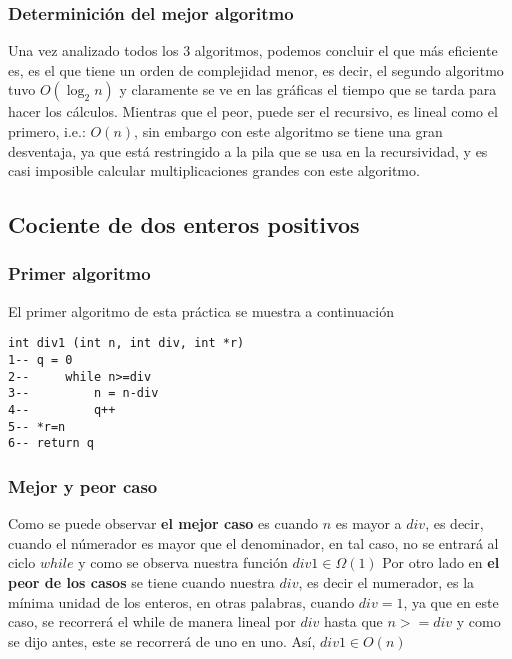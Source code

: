 \documentclass[12pt,twoside]{article}
\begin{document}
\subsubsection{Determinición del mejor algoritmo}
Una vez analizado todos los 3 algoritmos, podemos concluir el que más eficiente es, es el que tiene un orden de complejidad menor, es decir, el segundo algoritmo tuvo $O(\log_2n)$ y claramente se ve en las gráficas el tiempo que se tarda para hacer los cálculos. Mientras que el peor, puede ser el recursivo, es lineal como el primero, i.e.: $O(n)$, sin embargo con este algoritmo se tiene una gran desventaja, ya que está restringido a la pila que se usa en la recursividad, y es casi imposible calcular multiplicaciones grandes con este algoritmo.
\subsection{Cociente de dos enteros positivos}
\subsubsection{Primer algoritmo}
El primer algoritmo de esta práctica se muestra a continuación
\begin{lstlisting}
int div1 (int n, int div, int *r)
1-- q = 0
2--     while n>=div
3--         n = n-div
4--         q++
5-- *r=n
6-- return q
\end{lstlisting}
\subsubsection{Mejor y peor caso}
Como se puede observar \textbf{el mejor caso} es cuando $n$ es mayor a $div$, es decir, cuando el númerador es mayor que el denominador, en tal caso, no se entrará al ciclo $while$ y como se observa nuestra función $div1 \in \Omega(1)$ \newline\newline
Por otro lado en \textbf{el peor de los casos} se tiene cuando nuestra $div$, es decir el numerador, es la mínima unidad de los enteros, en otras palabras, cuando $div = 1$, ya que en este caso, se recorrerá el while de manera lineal por $div$ hasta que $n >= div$ y como se dijo antes, este se recorrerá de uno en uno. Así, $div1 \in O(n)$
\end{document}
